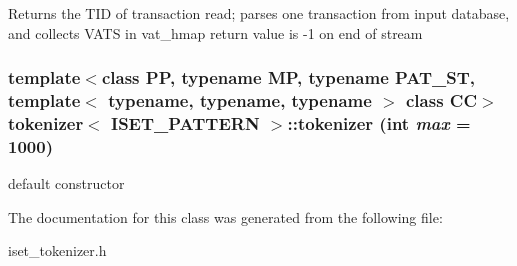 Returns the TID of transaction read; parses one transaction from input database, and collects VATS in vat\_\-hmap return value is -1 on end of stream 
\subsubsection{\setlength{\rightskip}{0pt plus 5cm}template$<$class PP, typename MP, typename PAT\_\-ST, template$<$ typename, typename, typename $>$ class CC$>$ {\bf tokenizer}$<$ ISET\_\-PATTERN $>$::{\bf tokenizer} (int {\em max} = 1000)\hspace{0.3cm}{\tt  [inline]}}\label{classtokenizer_3_01ISET__PATTERN_01_4_a0}


default constructor 

The documentation for this class was generated from the following file:\begin{CompactItemize}
\item 
iset\_\-tokenizer.h\end{CompactItemize}
